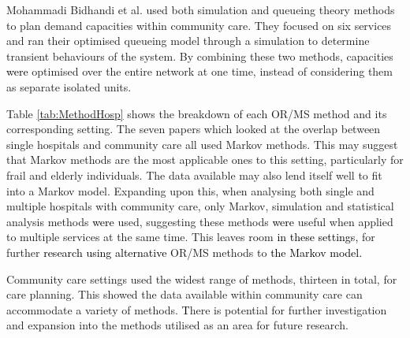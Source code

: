 \documentclass[../thesis.tex]{subfiles}
\begin{document}
Mohammadi Bidhandi et al. \cite{Bidhandi} used both simulation and queueing theory methods to plan demand capacities within community care. They focused on six services and ran their optimised queueing model through a simulation to determine transient behaviours of the system. By combining these two methods, capacities \textcolor{black}{were} optimised over the entire network at one time, instead of considering them as separate isolated units.

Table \ref{tab:MethodHosp} shows the breakdown of each OR/MS method and its corresponding setting. The seven papers which looked at the overlap between single hospitals and community care all used Markov methods. This may suggest that Markov methods are the most applicable ones to this setting, particularly for frail and elderly individuals. The data available may also lend itself well to fit into a Markov model. Expanding upon this, when analysing both single and multiple hospitals with community care, only Markov, simulation and statistical analysis methods \textcolor{black}{were} used, suggesting these methods \textcolor{black}{were} useful when applied to multiple services at the same time. This leaves room \textcolor{black}{in these settings,} for further \textcolor{black}{research} \textcolor{black}{using alternative} OR/MS methods to \textcolor{black}{the Markov model.} 

Community care settings used the widest range of methods, thirteen in total, for care planning. This showed the data available within community care can accommodate a variety of methods. \textcolor{black}{T}here is potential for further investigation and expansion into the methods utilised as an area for future research.
\end{document}
